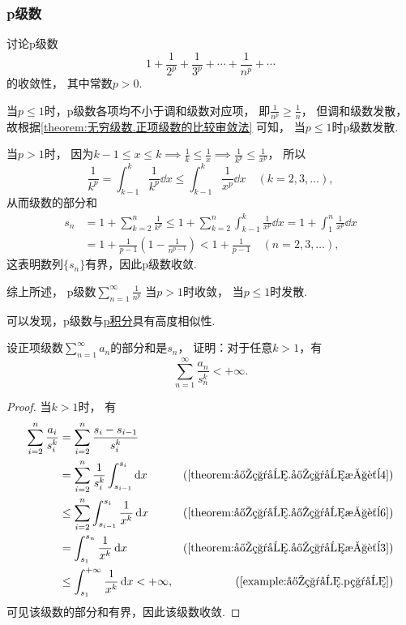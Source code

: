 \subsubsection{p级数}
\begin{proposition}\label{example:无穷级数.p级数的收敛性}
讨论p级数\[
	1+\frac{1}{2^p}+\frac{1}{3^p}+\dotsb+\frac{1}{n^p}+\dotsb
\]的收敛性，
其中常数\(p>0\).
\begin{solution}
当\(p \leq 1\)时，p级数各项均不小于调和级数对应项，
即\(\frac{1}{n^p} \geq \frac{1}{n}\)，
但调和级数发散，
故根据\cref{theorem:无穷级数.正项级数的比较审敛法} 可知，
当\(p \leq 1\)时p级数发散.

当\(p > 1\)时，
因为\(k-1
\leq x
\leq k \implies \frac{1}{k}
\leq \frac{1}{x} \implies \frac{1}{k^p}
\leq \frac{1}{x^p}\)，
所以\[
	\frac{1}{k^p}
	= \int_{k-1}^k \frac{1}{k^p} \dd{x}
	\leq \int_{k-1}^k \frac{1}{x^p} \dd{x}
	\quad(k=2,3,\dotsc),
\]
从而级数的部分和
\begin{align*}
	s_n &= 1 + \sum\limits_{k=2}^n{\frac{1}{k^p}}
	\leq 1 + \sum\limits_{k=2}^n{ \int_{k-1}^k{\frac{1}{x^p}\dd{x}} }
	= 1 + \int_1^n{\frac{1}{x^p}\dd{x}} \\
	&= 1 + \frac{1}{p-1}\left(1-\frac{1}{n^{p-1}}\right)
	< 1 + \frac{1}{p-1}
	\quad(n=2,3,\dotsc),
\end{align*}
这表明数列\(\{s_n\}\)有界，因此p级数收敛.

综上所述，{\color{red} p级数\(\sum\limits_{n=1}^\infty \frac{1}{n^p}\)
当\(p > 1\)时收敛，
当\(p \leq 1\)时发散.}
\end{solution}
\end{proposition}
可以发现，p级数与\hyperref[example:定积分.p积分]{p积分}具有高度相似性.

\begin{example}
设正项级数\(\sum\limits_{n=1}^\infty a_n\)的部分和是\(s_n\)，
证明：对于任意\(k>1\)，有\[
	\sum_{n=1}^\infty \frac{a_n}{s_n^k} < +\infty.
\]
\begin{proof}
当\(k>1\)时，
有\begin{align*}
	\sum_{i=2}^n \frac{a_i}{s_i^k}
	&= \sum_{i=2}^n \frac{s_i-s_{i-1}}{s_i^k} \\
	&= \sum_{i=2}^n \frac{1}{s_i^k} \int_{s_{i-1}}^{s_i} \dd{x}
			&(\text{\cref{theorem:定积分.定积分性质4}}) \\
	&\leq \sum_{i=2}^n \int_{s_{i-1}}^{s_i} \frac{1}{x^k} \dd{x}
			&(\text{\cref{theorem:定积分.定积分性质6}}) \\
	&= \int_{s_1}^{s_n} \frac{1}{x^k} \dd{x}
			&(\text{\cref{theorem:定积分.定积分性质3}}) \\
	&\leq \int_{s_1}^{+\infty} \frac{1}{x^k} \dd{x}
	< +\infty,
			&(\text{\cref{example:定积分.p积分}})
\end{align*}
可见该级数的部分和有界，因此该级数收敛.
\end{proof}
\end{example}

